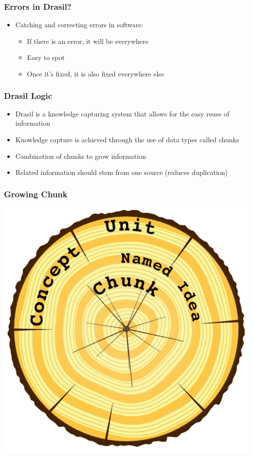 \documentclass{beamer}
\begin{document}
\begin{frame}
\frametitle{Errors in Drasil?}
\begin{itemize}
 \item<1-> Catching and correcting errors in software:\linebreak
  \begin{itemize}
   \item<2-> If there is an error, it will be everywhere\linebreak
   \item<3-> Easy to spot\linebreak
   \item<4-> Once it's fixed, it is also fixed everywhere else\linebreak
  \end{itemize}
\end{itemize}
\end{frame}

\begin{frame}
\frametitle{Drasil Logic}
\begin{itemize}
 \item<1-> Drasil is a knowledge capturing system that allows for the easy reuse of information
 \item<2-> Knowledge capture is achieved through the use of data types called chunks
 \item<3-> Combination of chunks to grow information
 \item<4-> Related information should stem from one source (reduces duplication)
\end{itemize}
\end{frame}

\begin{frame}
\frametitle{Growing Chunk}
\centering
\includegraphics[scale=0.45]{Tree_Chunk_Model.png}
\end{frame}
\end{document}
